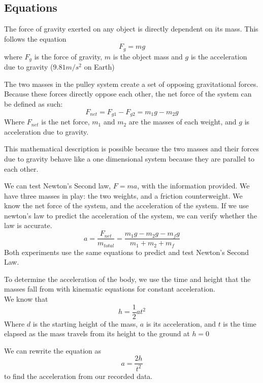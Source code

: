 \documentclass[12pt]{article}
\begin{document}
        \subsection{Equations}
            \par The force of gravity exerted on any object is directly dependent on 
            its mass. This follows the equation
            \begin{equation}
                F_g = mg
            \end{equation}
            where $F_g$ is the force of gravity, $m$ is the object mass and $g$ is
            the acceleration due to gravity ($9.81 m/s^2$ on Earth) 
            \par The two masses in the pulley system create a set of opposing 
            gravitational forces. Because these forces directly oppose each other,
            the net force of the system can be defined as such:
            \begin{equation}
                F_{net} = F_{g1} - F_{g2} = m_1g - m_2g
            \end{equation}
            Where $F_{net}$ is the net force, $m_1$ and $m_2$ are the masses of each 
            weight, and $g$ is acceleration due to gravity.
            \par This mathematical description is possible because the two masses
            and their forces due to gravity behave like a one dimensional system 
            because they are parallel to each other.
            \par We can test Newton's Second law, $F = ma$, with the information
            provided. We have three masses in play: the two weights, and a friction
            counterweight. We know the net force of the system, and the acceleration
            of the system. If we use newton's law to predict the acceleration of the
            system, we can verify whether the law is accurate.
            \begin{equation}
                a = \frac{F_{net}}{m_{total}} = \frac{m_1g - m_2g - m_fg}{m_1 + m_2 + m_f}
            \end{equation}
            Both experiments use the same equations to predict and test Newton's 
            Second Law.
            \par To determine the acceleration of the body, we use the time and 
            height that the masses fall from with kinematic equations for constant
            acceleration. \\
            We know that
            \begin{equation}
                h = \frac{1}{2}at^2
            \end{equation}
            Where $d$ is the starting height of the mass, $a$ is its acceleration,
            and $t$ is the time elapsed as the mass travels from its height to
            the ground at $h = 0$ \\
            \par We can rewrite the equation as
            \begin{equation}
                a = \frac{2h}{t^2}
            \end{equation}
            to find the acceleration from our recorded data.
\end{document}
